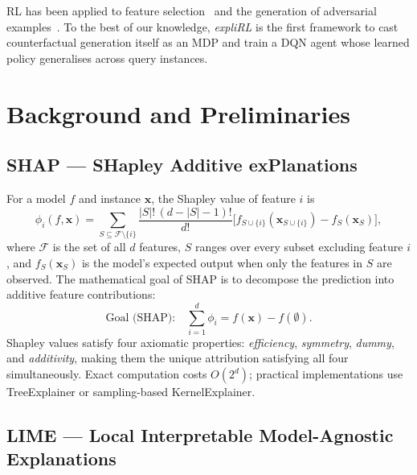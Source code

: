 \documentclass[conference]{IEEEtran}
\newcommand{\bx}{\mathbf{x}}
\begin{document}
RL has been applied to feature selection~\cite{gaudel2010rl} and the generation
of adversarial examples~\cite{guo2021rl}. To the best of our knowledge,
\emph{expliRL} is the first framework to cast counterfactual generation itself
as an MDP and train a DQN agent whose learned policy generalises across query
instances.

\section{Background and Preliminaries}
\label{sec:background}

\subsection{SHAP --- SHapley Additive exPlanations}

For a model $f$ and instance $\bx$, the Shapley value of feature $i$ is
\begin{equation}
\phi_i(f,\bx) = \sum_{S \subseteq \mathcal{F}\setminus\{i\}}
  \frac{|S|!\,(d-|S|-1)!}{d!}
  \bigl[f_{S\cup\{i\}}(\bx_{S\cup\{i\}}) - f_S(\bx_S)\bigr],
\label{eq:shap}
\end{equation}
where $\mathcal{F}$ is the set of all $d$ features, $S$ ranges over every subset
excluding feature $i$, and $f_S(\bx_S)$ is the model's expected output when only
the features in $S$ are observed. The mathematical goal of SHAP is to decompose
the prediction into additive feature contributions:
\[
  \text{Goal (SHAP):}\quad \sum_{i=1}^{d} \phi_i = f(\bx) - f(\emptyset).
\]
Shapley values satisfy four axiomatic properties: \emph{efficiency}, \emph{symmetry},
\emph{dummy}, and \emph{additivity}, making them the unique attribution satisfying
all four simultaneously. Exact computation costs $O(2^d)$; practical
implementations use TreeExplainer or sampling-based KernelExplainer.

\subsection{LIME --- Local Interpretable Model-Agnostic Explanations}
\end{document}
